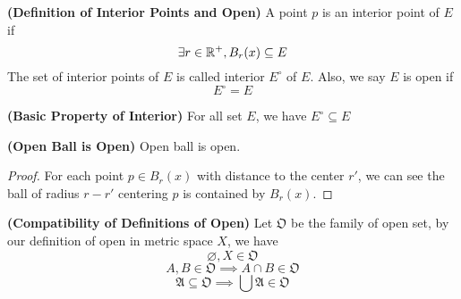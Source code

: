 \documentclass{report}
\begin{document}
\begin{definition}
\label{2.3.5}
\textbf{(Definition of Interior Points and Open)} A point $p$ is an interior point of $E$ if 
\begin{equation}
\exists r\in\mathbb{R}^+, B_r(x)\subseteq E
\end{equation}
The set  of interior points of  $E$ is called interior $E^{\circ }$ of $E$. Also, we say $E$ is open if 
\begin{equation}
E^\circ =E
\end{equation}
\end{definition}
\begin{theorem}
\label{2.3.6}
\textbf{(Basic Property of Interior)} For all set $E$, we have  $E^\circ \subseteq E$
\end{theorem}
\begin{theorem}
\label{2.3.7}
\textbf{(Open Ball is Open)} Open ball is open.
\end{theorem}
\begin{proof}
  For each point $p\in B_r(x)$ with distance to the center $r'$, we can see the ball of radius  $r-r'$ centering $p$ is contained by $B_r(x)$.
\end{proof}
\begin{theorem}
\label{2.3.8}
\textbf{(Compatibility of Definitions of Open)} 
Let $\mathfrak{O}$ be the family of open set, by our definition of open in metric space $X$, we have
 \begin{equation}
\varnothing , X \in \mathfrak{O}
\end{equation}
\begin{equation}
A, B \in \mathfrak{O}\implies A\cap B\in \mathfrak{O}
\end{equation}
\begin{equation}
\mathfrak{A}\subseteq \mathfrak{O}\implies \bigcup \mathfrak{A}\in\mathfrak{O}
\end{equation}
\end{theorem}
\end{document}
